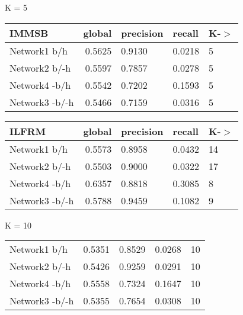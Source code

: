 \begin{table*}[h] \label{table:balanced}
\caption{Predictive Performance on a Balanced Testing set}
	\begin{minipage}[h]{0.45\linewidth} 
K =  5\hspace{5pt}
\begin{tabular}{lrlll}
\hline
 IMMSB   &   global &   precision &   recall &    K-\ensuremath{>} \\
\hline
 Network1 b/h           &   0.5625 &      0.9130 &   0.0218 & 5 \\
 Network2 b/-h        &   0.5597 &      0.7857 &   0.0278 & 5 \\
 Network4 -b/h         &   0.5542 &      0.7202 &   0.1593 & 5 \\
 Network3 -b/-h       &   0.5466 &      0.7159 &   0.0316 & 5 \\
\hline
\end{tabular}
\end{minipage}
\hspace{0.8cm}
\begin{minipage}[h]{0.45\linewidth}
\begin{tabular}{lrlll}
\hline
 ILFRM   &   global &   precision &   recall &     K-\ensuremath{>} \\
\hline
 Network1 b/h         &   0.5573 &      0.8958 &   0.0432 & 14 \\
 Network2 b/-h      &   0.5503 &      0.9000 &   0.0322 & 17 \\
 Network4 -b/h       &   0.6357 &      0.8818 &   0.3085 &  8 \\
 Network3 -b/-h     &   0.5788 &      0.9459 &   0.1082 &  9 \\
\hline
\end{tabular}
\end{minipage}


	\begin{minipage}[h]{0.45\linewidth} 
K = 10
\begin{tabular}{lrrrr}
 Network1 b/h           &   0.5351 &      0.8529 &   0.0268 & 10 \\
 Network2 b/-h        &   0.5426 &      0.9259 &   0.0291 & 10 \\
 Network4 -b/h         &   0.5558 &      0.7324 &   0.1647 & 10 \\
 Network3 -b/-h       &   0.5355 &      0.7654 &   0.0308 & 10 \\
\hline
\end{tabular}
\end{minipage}
\hspace{0.8cm}
\begin{minipage}[h]{0.45\linewidth}
\begin{tabular}{lrrrr}


\end{tabular}
\end{minipage}
\end{table*}
